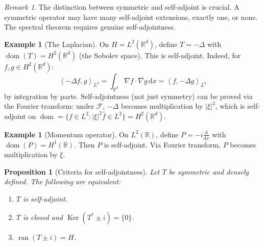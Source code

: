 \documentclass[a4paper,12pt]{book}
\DeclareMathOperator{\Ker}{Ker}
\DeclareMathOperator{\dom}{dom}
\DeclareMathOperator{\ran}{ran}
\newcommand{\R}{\mathbb{R}}
\newcommand{\dd}{\mathrm{d}}
\newcommand{\abs}[1]{\left| #1 \right|}
\newcommand{\inner}[2]{\left\langle #1, #2 \right\rangle}
\theoremstyle{definition}
\newtheorem{example}[definition]{Example}
\theoremstyle{plain}
\newtheorem{proposition}[definition]{Proposition}
\theoremstyle{remark}
\newtheorem{remark}[definition]{Remark}
\begin{document}
\begin{remark}\label{rem:sa-vs-symmetric}
The distinction between symmetric and self-adjoint is crucial. A symmetric operator
may have many self-adjoint extensions, exactly one, or none. The spectral theorem
requires genuine self-adjointness.
\end{remark}

\begin{example}[The Laplacian]\label{ex:laplacian}
On $H = L^2(\R^d)$, define $T = -\Delta$ with $\dom(T) = H^2(\R^d)$
(the Sobolev space). This is self-adjoint. Indeed,
for $f, g \in H^2(\R^d)$:
\[
  \inner{-\Delta f}{g}_{L^2} = \int_{\R^d} \nabla f \cdot \overline{\nabla g}\, \dd x
  = \inner{f}{-\Delta g}_{L^2}
\]
by integration by parts. Self-adjointness (not just symmetry) can be proved via
the Fourier transform: under $\mathcal{F}$, $-\Delta$
becomes multiplication by $\abs{\xi}^2$, which is self-adjoint on
$\dom = \{f \in L^2 : \abs{\xi}^2 \hat{f} \in L^2\} = H^2(\R^d)$.
\end{example}

\begin{example}[Momentum operator]\label{ex:momentum}
On $L^2(\R)$, define $P = -i\frac{\dd}{\dd x}$ with $\dom(P) = H^1(\R)$. Then
$P$ is self-adjoint. Via Fourier transform, $P$ becomes multiplication by $\xi$.
\end{example}

\begin{proposition}[Criteria for self-adjointness]\label{prop:sa-criteria}
Let $T$ be symmetric and densely defined. The following are equivalent:
\begin{enumerate}[label=(\roman*)]
  \item $T$ is self-adjoint.
  \item $T$ is closed and $\Ker(T^* \pm i) = \{0\}$.
  \item $\ran(T \pm i) = H$.
\end{enumerate}
\end{proposition}
\end{document}
